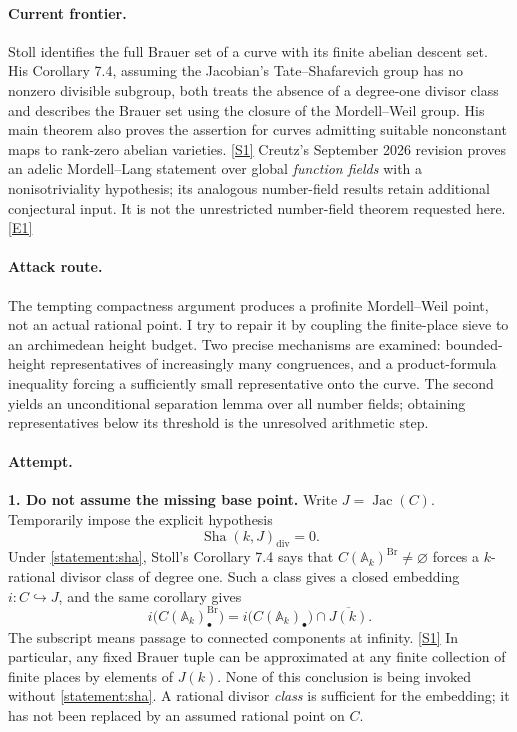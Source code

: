 \documentclass[11pt,a4paper]{article}
\newcommand{\A}{\mathbb{A}}
\newcommand{\sref}[2]{\hyperlink{source:#1:#2}{[S#2]}}
\newcommand{\eref}[2]{\hyperlink{extra:#1:#2}{[E#2]}}
\begin{document}
\paragraph{Current frontier.}
Stoll identifies the full Brauer set of a curve with its finite abelian
descent set. His Corollary 7.4, assuming the Jacobian's Tate--Shafarevich
group has no nonzero divisible subgroup, both treats the absence of a
degree-one divisor class and describes the Brauer set using the closure
of the Mordell--Weil group. His main theorem also proves the assertion for
curves admitting suitable nonconstant maps to rank-zero abelian varieties.
\sref{statement}{1} Creutz's September 2026 revision proves an adelic
Mordell--Lang statement over global \emph{function fields} with a
nonisotriviality hypothesis; its analogous number-field results retain
additional conjectural input. It is not the unrestricted number-field
theorem requested here.\eref{statement}{1}

\paragraph{Attack route.}
The tempting compactness argument produces a profinite Mordell--Weil point,
not an actual rational point. I try to repair it by coupling the finite-place
sieve to an archimedean height budget. Two precise mechanisms are examined:
bounded-height representatives of increasingly many congruences, and a
product-formula inequality forcing a sufficiently small representative
onto the curve. The second yields an unconditional separation lemma over
all number fields; obtaining representatives below its threshold is the
unresolved arithmetic step.

\paragraph{Attempt.}
\textbf{1. Do not assume the missing base point.}
Write $J=\operatorname{Jac}(C)$. Temporarily impose the explicit hypothesis
\begin{equation}\label{statement:sha}
 \operatorname{Sha}(k,J)_{\mathrm{div}}=0.
\end{equation}
Under \eqref{statement:sha}, Stoll's Corollary 7.4 says that
$C(\A_k)^{\operatorname{Br}}\ne\varnothing$ forces a $k$-rational divisor
class of degree one. Such a class gives a closed embedding $i:C\hookrightarrow J$,
and the same corollary gives
\[
 i\bigl(C(\A_k)^{\operatorname{Br}}_\bullet\bigr)
 =i\bigl(C(\A_k)_\bullet\bigr)\cap\overline{J(k)}.
\]
The subscript means passage to connected components at infinity.
\sref{statement}{1} In particular, any fixed Brauer tuple can be approximated
at any finite collection of finite places by elements of $J(k)$.
None of this conclusion is being invoked without \eqref{statement:sha}.
A rational divisor \emph{class} is sufficient for the embedding; it has
not been replaced by an assumed rational point on $C$.
\end{document}
